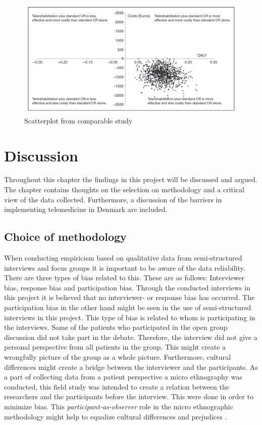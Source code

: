 \begin{figure}[H]
\centering
\includegraphics[width=1\textwidth]{Figure/scatter.png}
\caption{Scatterplot from comparable study \cite{costeffect}}
\label{fig:scatter}
\end{figure} 

\chapter{Discussion}

Throughout this chapter the findings in this project will be discussed and argued. The chapter contains thoughts on the selection on methodology and a critical view of the data collected. Furthermore, a discussion of the barriers in implementing telemedicine in Denmark are included.

\section{Choice of methodology}

When conducting empiricism based on qualitative data from semi-structured interviews and focus groups it is important to be aware of the data reliability. There are three types of bias related to this. These are as follows: Interviewer bias, response bias and participation bias. Through the conducted interviews in this project it is believed that no interviewer- or response bias has occurred. The participation bias in the other hand might be seen in the use of semi-structured interviews in this project. This type of bias is related to whom is participating in the interviews. Some of the patients who participated in the open group discussion did not take part in the debate. Therefore, the interview did not give a personal perspective from all patients in the group. This might create a wrongfully picture of the group as a whole picture. Furthermore, cultural differences might create a bridge between the interviewer and the participants. As a part of collecting data from a patient perspective a micro ethnography was conducted, this field study was intended to create a relation between the researchers and the participants before the interview. This were done in order to minimize bias. This \textit{participant-as-observer} role in the micro ethnographic methodology might help to equalize cultural differences and prejudices \cite{mark2009research}.  

